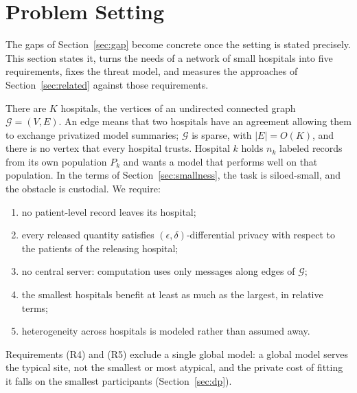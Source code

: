 \documentclass[acmsmall,screen,review]{acmart}
\theoremstyle{acmdefinition}
\begin{document}
\section{Problem Setting}\label{sec:problem}

The gaps of Section~\ref{sec:gap} become concrete once the setting is stated precisely. This section states it, turns the needs of a network of small hospitals into five requirements, fixes the threat model, and measures the approaches of Section~\ref{sec:related} against those requirements.

There are $K$ hospitals, the vertices of an undirected connected graph $\mathcal{G}=(V,E)$. An edge means that two hospitals have an agreement allowing them to exchange privatized model summaries; $\mathcal{G}$ is sparse, with $|E|=O(K)$, and there is no vertex that every hospital trusts. Hospital $k$ holds $n_k$ labeled records from its own population $P_k$ and wants a model that performs well on that population. In the terms of Section~\ref{sec:smallness}, the task is siloed-small, and the obstacle is custodial. We require:
\begin{enumerate}[label=(R\arabic*),leftmargin=*,itemsep=1pt]
\item no patient-level record leaves its hospital;
\item every released quantity satisfies $(\epsilon,\delta)$-differential privacy with respect to the patients of the releasing hospital;
\item no central server: computation uses only messages along edges of $\mathcal{G}$;
\item the smallest hospitals benefit at least as much as the largest, in relative terms;
\item heterogeneity across hospitals is modeled rather than assumed away.
\end{enumerate}
Requirements (R4) and (R5) exclude a single global model: a global model serves the typical site, not the smallest or most atypical, and the private cost of fitting it falls on the smallest participants (Section~\ref{sec:dp}).
\end{document}
